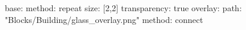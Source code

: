 base:
  method: repeat
  size: [2,2]
  transparency: true
overlay:
  path: "Blocks/Building/glass_overlay.png"
  method: connect